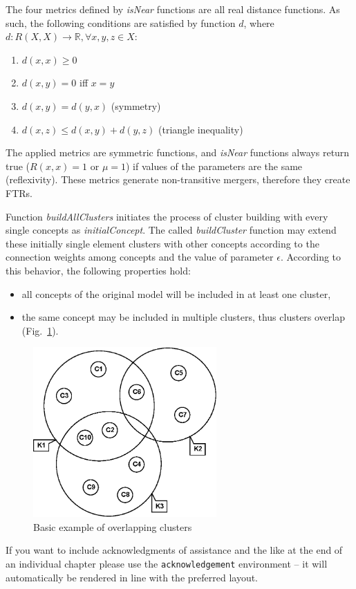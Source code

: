 \documentclass[graybox]{svmult}
\begin{document}
The four metrics defined by \emph{isNear} functions are all real 
distance functions. As such, the following conditions are satisfied by 
function $d$, where $d:R(X,X)\rightarrow \mathbb{R}, \forall x,y,z \in 
X$:

\begin{enumerate}
\item $d(x,x) \geq 0$
\item $d(x,y) = 0$ iff $x=y$
\item $d(x,y) = d(y,x)$ (symmetry)
\item $d(x,z) \leq d(x,y) + d(y,z)$ (triangle inequality)
\end{enumerate}

The applied metrics are symmetric functions, and \emph{isNear} 
functions always return true ($R(x,x) = 1$ or $\mu = 1$) if values of 
the parameters are the same (reflexivity). These metrics generate 
non-transitive mergers, therefore they create FTRs.

Function \emph{buildAllClusters} initiates the process of cluster 
building with every single concepts as \emph{initialConcept}. The called 
\emph{buildCluster} function may extend these initially single element 
clusters with other concepts according to the connection weights among 
concepts and the value of parameter $\epsilon$. According to this 
behavior, the following properties hold:

\begin{itemize}
  \item all concepts of the original model will be included in at least one cluster, 
  \item the same concept may be included in multiple clusters, thus 
  clusters overlap (Fig.~\ref{fig:overlapping}).
\end{itemize}

\begin{figure}[hbt]
  \sidecaption
  \includegraphics[width=7cm]{clusters.eps}
  \caption{Basic example of overlapping clusters \cite{hatwagnerm.f.koczyl.t.2015}}
  \label{fig:overlapping}
\end{figure}

\begin{acknowledgement}
If you want to include acknowledgments of assistance and the like at the end of an individual chapter please use the \verb|acknowledgement| environment -- it will automatically be rendered in line with the preferred layout.
\end{acknowledgement}


\end{document}
